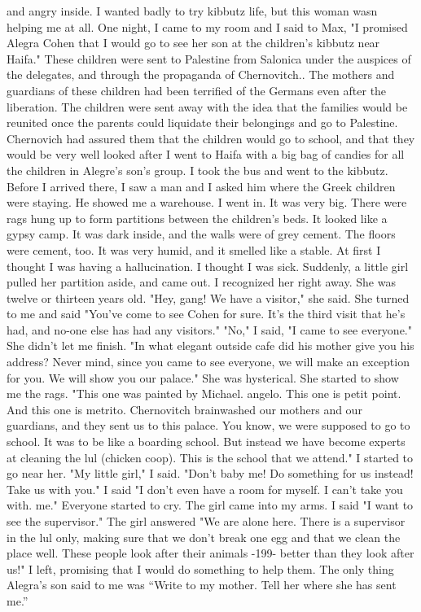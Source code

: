 and angry inside.
I wanted badly to try kibbutz life, but this
woman wasn helping me at all.
One night, I came to my room and I said to Max, "I promised Alegra 
Cohen that I would go to see her son at the children's kibbutz near 
Haifa."
These children were sent to Palestine from Salonica under 
the auspices of the delegates, and through the propaganda of Chernovitch.. 
The mothers and guardians of these children had been terrified of the 
Germans even after the liberation.
The children were sent away with the 
idea that the families would be reunited once the parents could liquidate their belongings and go to Palestine.
Chernovich had assured them 
that the children would go to school, and that they would be very well 
looked after 
I went to Haifa with a big bag of candies for all the children 
in Alegre's son's group.
I took the bus and went to the kibbutz.
Before I arrived there, I saw a man and I asked him where the Greek 
children were staying.
He showed me a warehouse.
I went in.
It was 
very big.
There were rags hung up to form partitions between the children's beds.
It looked like a gypsy camp.
It was dark inside, and the 
walls were of grey cement.
The floors were cement, too.
It was very 
humid, and it smelled like a stable.
At first I thought I was having a 
hallucination.
I thought I was sick.
Suddenly, a little girl pulled 
her partition aside, and came out.
I recognized her right away.
She was 
twelve or thirteen years old.
"Hey, gang!
We have a visitor," she said.
She turned to me and 
said "You've come to see Cohen for sure.
It's the third visit that he's
had, and no-one else has had any visitors."
"No," I said, "I came to see everyone."
She didn't let me finish.
"In what elegant outside cafe did his mother give you his address?
Never mind, since you came to see everyone, we will make an exception 
for you.
We will show you our palace."
She was hysterical.
She started to show me the rags.
"This one was painted by Michael.
angelo.
This one is petit point.
And this one is metrito.
Chernovitch  
brainwashed our mothers and our guardians, and they sent us to this palace.
You know, we were supposed to go to school.
It was to be like a
boarding school.
But instead we have become experts at cleaning the lul 
(chicken coop).
This is the school that we attend."
I started to go near her.
"My little girl," I said.
"Don't baby me!
Do something for us instead!
Take us with you."
I said "I don't even have a room for myself.
I can't take you with.
me."
Everyone started to cry.
The girl came into my arms.
I said "I 
want to see the supervisor."
The girl answered "We are alone here.
There is a supervisor in the lul only, making sure that we don't break one egg 
and that we clean the place well.
These people look after their animals 
-199- 
better than they look after us!"
I left, promising that I would do something to help them.
The only 
thing Alegra's son said to me was “Write to my mother.
Tell her where 
she has sent me.”